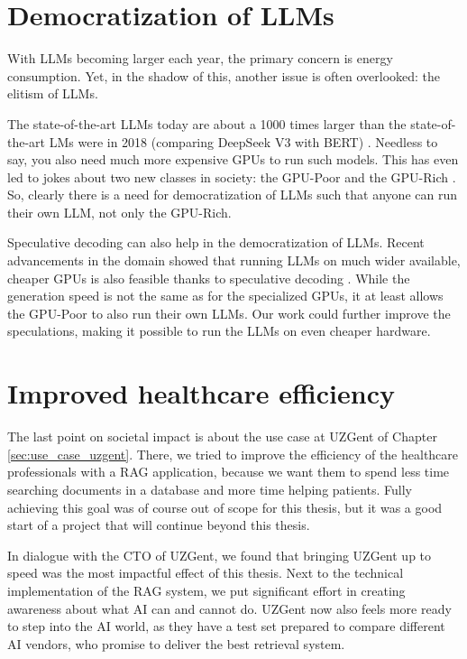 \section{Democratization of LLMs}
With LLMs becoming larger each year, the primary concern is energy consumption. Yet, in the shadow of this, another issue is often overlooked: the elitism of LLMs. 

The state-of-the-art LLMs today are about a 1000 times larger than the state-of-the-art LMs were in 2018 (comparing DeepSeek V3 with BERT) \cite{devlin2019bert, liu2024deepseek}. Needless to say, you also need much more expensive GPUs to run such models. This has even led to jokes about two new classes in society: the GPU-Poor and the GPU-Rich \cite{envisioning2025gpu}. So, clearly there is a need for democratization of LLMs such that anyone can run their own LLM, not only the GPU-Rich.

Speculative decoding can also help in the democratization of LLMs. Recent advancements in the domain showed that running LLMs on much wider available, cheaper GPUs is also feasible thanks to speculative decoding \cite{svirschevski2024specexec}. While the generation speed is not the same as for the specialized GPUs, it at least allows the GPU-Poor to also run their own LLMs. Our work could further improve the speculations, making it possible to run the LLMs on even cheaper hardware.

\section{Improved healthcare efficiency}
The last point on societal impact is about the use case at UZGent of Chapter \ref{sec:use_case_uzgent}. There, we tried to improve the efficiency of the healthcare professionals with a RAG application, because we want them to spend less time searching documents in a database and more time helping patients. Fully achieving this goal was of course out of scope for this thesis, but it was a good start of a project that will continue beyond this thesis.

In dialogue with the CTO of UZGent, we found that bringing UZGent up to speed was the most impactful effect of this thesis. Next to the technical implementation of the RAG system, we put significant effort in creating awareness about what AI can and cannot do. UZGent now also feels more ready to step into the AI world, as they have a test set prepared to compare different AI vendors, who promise to deliver the best retrieval system.
